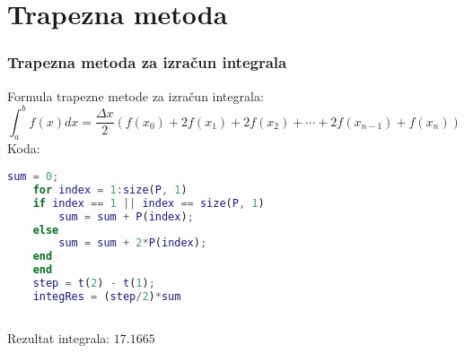 \documentclass{beamer}
\begin{document}
\section{Trapezna metoda}
\begin{frame}[fragile]
\frametitle{Trapezna metoda za izračun integrala}
    Formula trapezne metode za izračun integrala:
    \[
    \int_a^b f(x)dx = \frac{\Delta x}{2} \left(f(x_0) + 2f(x_1) + 2f(x_2) + \cdots + 2f(x_{n-1}) + f(x_n)\right)
    \]
    Koda:
    \begin{lstlisting}[language=Matlab]
    sum = 0;
    for index = 1:size(P, 1)
    if index == 1 || index == size(P, 1)
        sum = sum + P(index);
    else
        sum = sum + 2*P(index);
    end
    end
    step = t(2) - t(1);
    integRes = (step/2)*sum
    
    \end{lstlisting}

    Rezultat integrala: $17.1665$
\end{frame}
\end{document}

